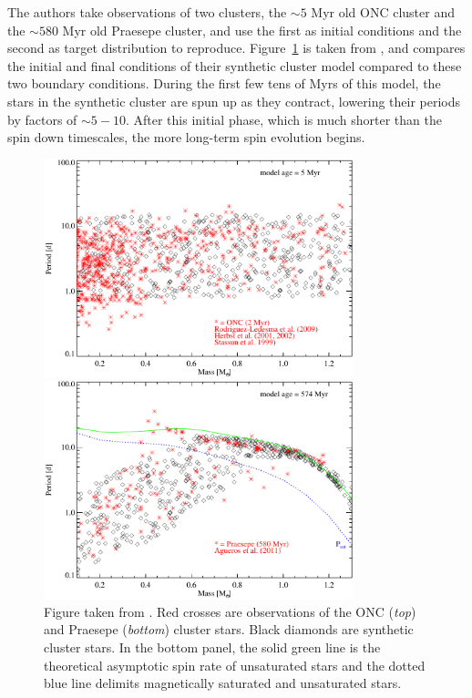 The authors take observations of two clusters, the $\sim 5$ Myr old ONC cluster and the $\sim 580$ Myr old Praesepe cluster, and use the first as initial conditions and the second as target distribution to reproduce. Figure~\ref{fig:introduction:Matt 2015 figure 2} is taken from \citet{matt2015}, and compares the initial and final conditions of their synthetic cluster model compared to these two boundary conditions. During the first few tens of Myrs of this model, the stars in the synthetic cluster are spun up as they contract, lowering their periods by factors of $\sim 5-10$. After this initial phase, which is much shorter than the spin down timescales, the more long-term spin evolution begins.
\begin{figure}
    \centering
    \begin{minipage}[b]{\textwidth}
        \centering
        \includegraphics[width=0.8\textwidth]{figures/introduction/matt_2015_fig2a.pdf}
    \end{minipage}
    \begin{minipage}[b]{\textwidth}
        \centering
        \includegraphics[width=0.8\textwidth]{figures/introduction/matt_2015_fig2b.pdf}
    \end{minipage}
    \caption{Figure taken from \citet{matt2015}. Red crosses are observations of the ONC ({\it top}) and Praesepe ({\it bottom}) cluster stars. Black diamonds are synthetic cluster stars. In the bottom panel, the solid green line is the theoretical asymptotic spin rate of unsaturated stars and the dotted blue line delimits magnetically saturated and unsaturated stars.}
    \label{fig:introduction:Matt 2015 figure 2}
\end{figure}

